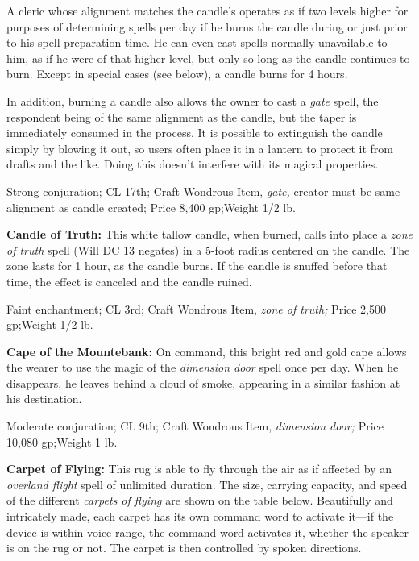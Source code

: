 A cleric whose alignment matches the candle's operates as if two levels higher 
for purposes of determining spells per day if he burns the candle during or just 
prior to his spell preparation time. He can even cast spells normally unavailable 
to him, as if he were of that higher level, but only so long as the candle continues 
to burn. Except in special cases (see below), a candle burns for 4 hours.

In addition, burning a candle also allows the owner to cast a \textit{gate }spell, 
the respondent being of the same alignment as the candle, but the taper is immediately 
consumed in the process. It is possible to extinguish the candle simply by blowing 
it out, so users often place it in a lantern to protect it from drafts and the 
like. Doing this doesn't interfere with its magical properties.

Strong conjuration; CL 17th; Craft Wondrous Item, \textit{gate, }creator must be 
same alignment as candle created; Price 8,400 gp;Weight 1/2 lb.

\textbf{Candle of Truth:} This white tallow candle, when burned, calls into place 
a \textit{zone of truth }spell (Will DC 13 negates) in a 5-foot radius centered 
on the candle. The zone lasts for 1 hour, as the candle burns. If the candle is 
snuffed before that time, the effect is canceled and the candle ruined.

Faint enchantment; CL 3rd; Craft Wondrous Item, \textit{zone of truth; }Price 2,500 
gp;Weight 1/2 lb.

\textbf{Cape of the Mountebank:} On command, this bright red and gold cape allows 
the wearer to use the magic of the \textit{dimension door }spell once per day. 
When he disappears, he leaves behind a cloud of smoke, appearing in a similar fashion 
at his destination.

Moderate conjuration; CL 9th; Craft Wondrous Item, \textit{dimension door; }Price 
10,080 gp;Weight 1 lb.

\textbf{Carpet of Flying:} This rug is able to fly through the air as if affected 
by an \textit{overland flight }spell of unlimited duration. The size, carrying 
capacity, and speed of the different \textit{carpets of flying }are shown on the 
table below. Beautifully and intricately made, each carpet has its own command 
word to activate it---if the device is within voice range, the command word activates 
it, whether the speaker is on the rug or not. The carpet is then controlled by 
spoken directions.


